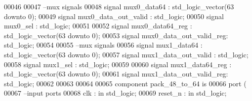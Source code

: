 \begin{DoxyCode}
00046 
00047 \textcolor{keyword}{--mux signals}
00048 \textcolor{keywordflow}{signal} \textcolor{vhdlchar}{mux0_data64}            \textcolor{vhdlchar}{:} \textcolor{comment}{std\_logic\_vector}\textcolor{vhdlchar}{(}\textcolor{vhdllogic}{}\textcolor{vhdllogic}{63} \textcolor{keywordflow}{downto} \textcolor{vhdllogic}{}\textcolor{vhdllogic}{0}\textcolor{vhdlchar}{)};
00049 \textcolor{keywordflow}{signal} \textcolor{vhdlchar}{mux0_data_out_valid}    \textcolor{vhdlchar}{:} \textcolor{comment}{std\_logic};
00050 \textcolor{keywordflow}{signal} \textcolor{vhdlchar}{mux0_sel}               \textcolor{vhdlchar}{:} \textcolor{comment}{std\_logic};
00051 
00052 \textcolor{keywordflow}{signal} \textcolor{vhdlchar}{mux0_data64_reg}        \textcolor{vhdlchar}{:} \textcolor{comment}{std\_logic\_vector}\textcolor{vhdlchar}{(}\textcolor{vhdllogic}{}\textcolor{vhdllogic}{63} \textcolor{keywordflow}{downto} \textcolor{vhdllogic}{}\textcolor{vhdllogic}{0}\textcolor{vhdlchar}{)};
00053 \textcolor{keywordflow}{signal} \textcolor{vhdlchar}{mux0_data_out_valid_reg}\textcolor{vhdlchar}{:} \textcolor{comment}{std\_logic};
00054 
00055 \textcolor{keyword}{--mux signals}
00056 \textcolor{keywordflow}{signal} \textcolor{vhdlchar}{mux1_data64}            \textcolor{vhdlchar}{:} \textcolor{comment}{std\_logic\_vector}\textcolor{vhdlchar}{(}\textcolor{vhdllogic}{}\textcolor{vhdllogic}{63} \textcolor{keywordflow}{downto} \textcolor{vhdllogic}{}\textcolor{vhdllogic}{0}\textcolor{vhdlchar}{)};
00057 \textcolor{keywordflow}{signal} \textcolor{vhdlchar}{mux1_data_out_valid}    \textcolor{vhdlchar}{:} \textcolor{comment}{std\_logic};
00058 \textcolor{keywordflow}{signal} \textcolor{vhdlchar}{mux1_sel}               \textcolor{vhdlchar}{:} \textcolor{comment}{std\_logic};
00059 
00060 \textcolor{keywordflow}{signal} \textcolor{vhdlchar}{mux1_data64_reg}        \textcolor{vhdlchar}{:} \textcolor{comment}{std\_logic\_vector}\textcolor{vhdlchar}{(}\textcolor{vhdllogic}{}\textcolor{vhdllogic}{63} \textcolor{keywordflow}{downto} \textcolor{vhdllogic}{}\textcolor{vhdllogic}{0}\textcolor{vhdlchar}{)};
00061 \textcolor{keywordflow}{signal} \textcolor{vhdlchar}{mux1_data_out_valid_reg}\textcolor{vhdlchar}{:} \textcolor{comment}{std\_logic};
00062 
00063 
00064 
00065 \textcolor{keywordflow}{component} pack_48_to_64 \textcolor{keywordflow}{is}
00066   \textcolor{keywordflow}{port} (
00067 \textcolor{keyword}{      --input ports }
00068       clk               : \textcolor{keywordflow}{in} \textcolor{comment}{std\_logic};
00069       reset_n           : \textcolor{keywordflow}{in} \textcolor{comment}{std\_logic};

\end{DoxyCode}

